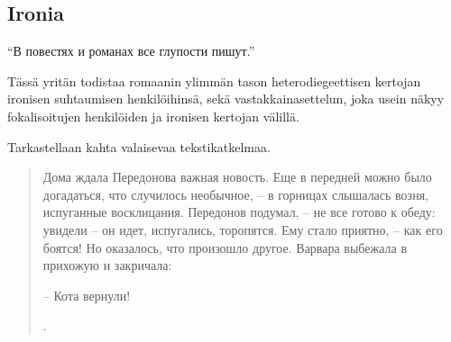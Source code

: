 \documentclass[12pt,a4paper]{article}
\begin{document}
\begin{comment}
Jerofejevin tekemä huomio monikasvoisesta \enquote{многолик} kertojasta on kuitenkin asiaankuuluva, ja tätä aspektia ei Mintsin artikkelissa oteta huomioon. Uusmytologisen tekstin myyttien keskinäinen dikotomia ei voi olla näkymättä myös romaanin kerronnassa ja narrotologisessa rakenteessa. 

\section{Мелкий бес}

В этом главе рассматрываем основный и самый популярный роман Федора Сологуба <<Мелкий бес>> (закончен в 1902, впервые опубликован в 1905) с точки зрения нарратологий. Разные исследователи характеризировали сюжет романа либо как антисюжет -- очень симплистическая истрория в котором почти ничего не произходит, либо как максимально  
''Внешнего действия в «Мелком бесе» мало. Постепенно сходит с ума его главный герой, учитель гимназии Передонов, умственно ограниченный, угрюмый и недоброжелательный человек.''
\autocite[432.]{grigorjev1983}
\end{comment}

\subsection{Ironia}

\enquote{В повестях и романах все глупости пишут.}\parencite[54]{sologub2004}

Tässä yritän todistaa romaanin ylimmän tason heterodiegeettisen kertojan ironisen suhtaumisen henkilöihinsä, sekä vastakkainasettelun, joka usein näkyy fokalisoitujen henkilöiden ja ironisen kertojan välillä.

Tarkastellaan kahta valaisevaa tekstikatkelmaa.

\begin{quote}
Дома ждала Передонова важная новость. Еще в передней можно
было догадаться, что случилось необычное, – в горницах слышалась 
возня, испуганные восклицания. Передонов подумал, – не все
готово к обеду: увидели – он идет, испугались, торопятся. Ему стало
приятно, – как его боятся! Но оказалось, что произошло другое. 
Варвара выбежала в прихожую и закричала:

– Кота вернули!

\parencite[171]{sologub2004}.

\end{quote}
\end{document}
